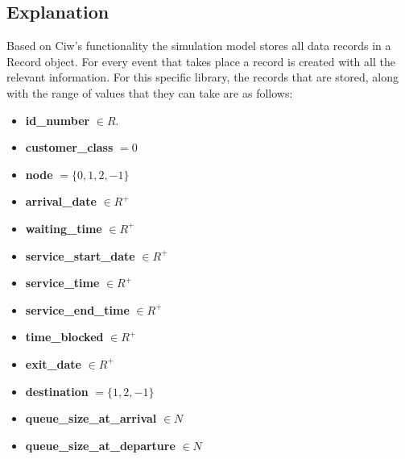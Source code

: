 


\subsection{Explanation}

Based on Ciw's functionality the simulation model stores all data records in a
Record object. 
For every event that takes place a record is created with all the relevant
information.
For this specific library, the records that are stored, along with the 
range of values that they can take are as follows:

\begin{multicols}{2}
    \begin{itemize}
        \item \textbf{id\_number} \(\in R\).
        \item \textbf{customer\_class} \(= 0\)
        \item \textbf{node} \(= \{0, 1, 2, -1 \} \)
        \item \textbf{arrival\_date} \( \in R^+ \)
        \item \textbf{waiting\_time} \( \in R^+ \)
        \item \textbf{service\_start\_date} \( \in R^+ \)
        \item \textbf{service\_time} \( \in R^+ \)
        \item \textbf{service\_end\_time} \( \in R^+ \)
        \item \textbf{time\_blocked} \( \in R^+ \)
        \item \textbf{exit\_date} \( \in R^+ \)
        \item \textbf{destination} \( = \{1, 2, -1\} \)
        \item \textbf{queue\_size\_at\_arrival} \( \in N \)
        \item \textbf{queue\_size\_at\_departure} \( \in N \)
    \end{itemize}
\end{multicols}



